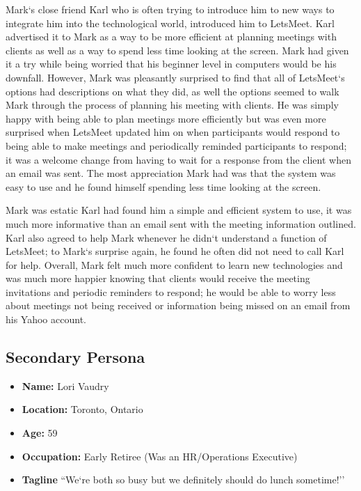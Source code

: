 \documentclass{sigchi}
\begin{document}
Mark`s close friend Karl who is often trying to introduce him to new ways to integrate him into the technological world, introduced him to LetsMeet. Karl advertised it to Mark as a way to be more efficient at planning meetings with clients as well as a way to spend less time looking at the screen. Mark had given it a try while being worried that his beginner level in computers would be his downfall. However, Mark was pleasantly surprised to find that all of LetsMeet`s options had descriptions on what they did, as well the options seemed to walk Mark through the process of planning his meeting with clients. He was simply happy with being able to plan meetings more efficiently but was even more surprised when LetsMeet updated him on when participants would respond to being able to make meetings and periodically reminded participants to respond; it was a welcome change from having to wait for a response from the client when an email was sent. The most appreciation Mark had was that the system was easy to use and he found himself spending less time looking at the screen.

Mark was estatic Karl had found him a simple and efficient system to use, it was much more informative than an email sent with the meeting information outlined. Karl also agreed to help Mark whenever he didn`t understand a function of LetsMeet; to Mark`s surprise again, he found he often did not need to call Karl for help. Overall, Mark felt much more confident to learn new technologies and was much more happier knowing that clients would receive the meeting invitations and periodic reminders to respond; he would be able to worry less about meetings not being received or information being missed on an email from his Yahoo account.

\subsection{Secondary Persona}
\begin{itemize}
	\item \textbf{Name:} Lori Vaudry
	\item \textbf{Location:} Toronto, Ontario
	\item \textbf{Age:} 59
	\item \textbf{Occupation:} Early Retiree (Was an HR/Operations Executive)
	\item \textbf{Tagline} ``We`re both so busy but we definitely should do lunch sometime!''
\end{itemize}
\end{document}
